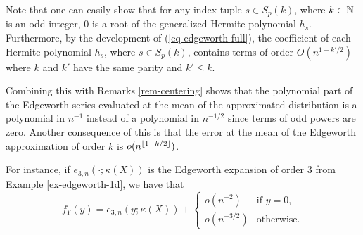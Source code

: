 \begin{remark} \label{rem-edge-mean}
    Note that one can easily show that for any index tuple $s \in S_p(k)$, where $k \in \mathbb{N}$ is an odd integer, 0 is a root of the generalized Hermite polynomial $h_s$. 
    Furthermore, by the development of (\ref{eq-edgeworth-full}), the coefficient of each Hermite polynomial $h_s$, where $s \in S_p(k)$, contains terms of order $O(n^{1-k'/2})$ where $k$ and $k'$ have the same parity and $k' \leq k$.

    Combining this with Remarks \ref{rem-centering} shows that the polynomial part of the Edgeworth series evaluated at the mean of the approximated distribution is a polynomial in $n^{-1}$ instead of a polynomial in $n^{-1/2}$ since terms of odd powers are zero. Another consequence of this is that the error at the mean of the Edgeworth approximation of order $k$ is $o(n^{\lfloor1-k/2\rfloor})$. 
    
    For instance, if $e_{3, n}(\cdot; \kappa(X))$ is the Edgeworth expansion of order $3$ from Example \ref{ex-edgeworth-1d}, we have that
    \begin{equation*}
        f_Y(y) = e_{3, n}(y; \kappa(X)) + \begin{cases}
            o(n^{-2}) &\text{if } y = 0,\\
            o(n^{-3/2}) &\text{otherwise}.
        \end{cases} 
    \end{equation*} 
\end{remark}
